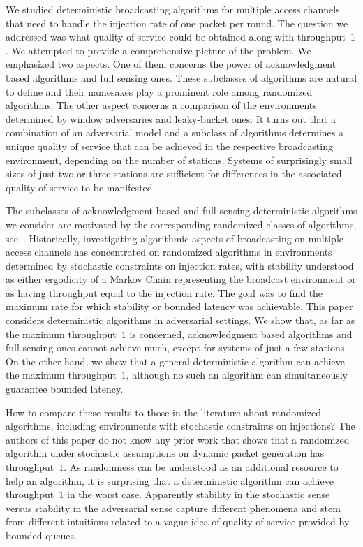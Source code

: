 \documentclass[11pt]{article}
\begin{document}
We studied deterministic broadcasting algorithms for multiple access channels that need to handle the injection rate of one packet per round.
The question we addressed was what quality of service could be obtained along with throughput~$1$.
We attempted to provide a comprehensive picture of the problem.
We emphasized two aspects.
One of them concerns the power of acknowledgment based algorithms and full sensing ones.
These subclasses of algorithms are natural to define and their namesakes play a prominent role among randomized algorithms.
The other aspect concerns a comparison of the environments determined by window adversaries and leaky-bucket ones.
It turns out that a combination of an adversarial model and a subclass of algorithms determines a unique quality of service that can be achieved in the respective broadcasting environment, depending on the number of stations.
Systems of surprisingly small sizes of just two or three stations are sufficient for  differences in the associated quality of service to be manifested.


The  subclasses of acknowledgment based and full sensing deterministic algorithms we consider are motivated by the corresponding randomized classes of algorithms, see~\cite{Gallager85}.
Historically, investigating algorithmic aspects of broadcasting on multiple access channels has concentrated on randomized algorithms in environments determined by  stochastic constraints on injection rates, with stability understood as either ergodicity of a Markov Chain representing the broadcast environment or as having throughput equal to the injection rate.
The goal was to find the maximum rate for which stability or bounded latency was achievable.
This paper considers deterministic algorithms in adversarial settings.
We show that, as far as the maximum throughput~$1$ is concerned, acknowledgment based algorithms and full sensing ones cannot achieve much, except for systems of just a few stations.
On the other hand, we show that a general deterministic algorithm can achieve the maximum throughput~$1$, although no such an algorithm can simultaneously guarantee bounded latency.

How to compare these results to those in the literature about randomized algorithms, including environments with stochastic constraints on injections?
The authors of this paper do not know any prior work that shows that a randomized algorithm under stochastic assumptions on dynamic packet generation has throughput~$1$.
As randomness can be understood as an additional resource to help an algorithm, it is  surprising that a deterministic algorithm can achieve throughput~$1$ in the worst case.
Apparently stability in the stochastic sense versus stability in the adversarial sense capture different phenomena and stem from different intuitions related to a vague idea of quality of service provided by bounded queues.







\end{document}

